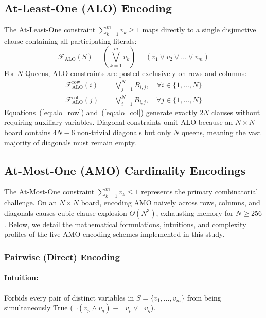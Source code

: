 \documentclass[a4paper,fleqn]{cas-sc}
\begin{document}
\subsection{At-Least-One (ALO) Encoding}
\label{subsec:alo_encoding}
The At-Least-One constraint $\sum_{k=1}^m v_k \ge 1$ maps directly to a single disjunctive clause containing all participating literals:
\begin{equation}
    \mathcal{F}_{\text{ALO}}(S) = \left( \bigvee_{k=1}^{m} v_k \right) = (v_1 \vee v_2 \vee \dots \vee v_m)
\end{equation}
For $N$-Queens, ALO constraints are posted exclusively on rows and columns:
\begin{align}
    \mathcal{F}_{\text{ALO}}^{\text{row}}(i) &= \bigvee_{j=1}^{N} B_{i,j}, \quad \forall i \in \{1, \dots, N\} \label{eq:alo_row} \\
    \mathcal{F}_{\text{ALO}}^{\text{col}}(j) &= \bigvee_{i=1}^{N} B_{i,j}, \quad \forall j \in \{1, \dots, N\} \label{eq:alo_col}
\end{align}
Equations~(\ref{eq:alo_row}) and~(\ref{eq:alo_col}) generate exactly $2N$ clauses without requiring auxiliary variables. Diagonal constraints omit ALO because an $N \times N$ board contains $4N - 6$ non-trivial diagonals but only $N$ queens, meaning the vast majority of diagonals must remain empty.

\subsection{At-Most-One (AMO) Cardinality Encodings}
\label{subsec:amo_encodings}
The At-Most-One constraint $\sum_{k=1}^m v_k \le 1$ represents the primary combinatorial challenge. On an $N \times N$ board, encoding AMO naively across rows, columns, and diagonals causes cubic clause explosion $\Theta(N^3)$, exhausting memory for $N \ge 256$. Below, we detail the mathematical formulations, intuitions, and complexity profiles of the five AMO encoding schemes implemented in this study.

\subsubsection{Pairwise (Direct) Encoding}
\paragraph{Intuition:} Forbids every pair of distinct variables in $S = \{v_1, \dots, v_m\}$ from being simultaneously True ($\neg(v_p \wedge v_q) \equiv \neg v_p \vee \neg v_q$).
\end{document}

